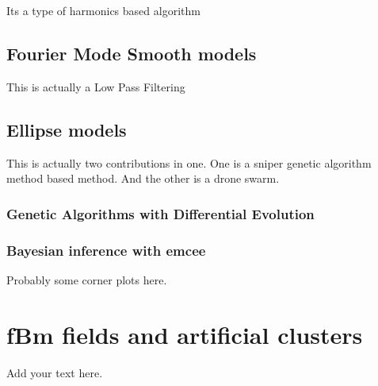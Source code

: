 Its a type of harmonics based algorithm

\subsection{Fourier Mode Smooth models}\label{Chap:interrogationsFourierFiltering}

This is actually a Low Pass Filtering

\subsection{Ellipse models}\label{Chap:interrogationsEllipse}

This is actually two contributions in one. One is a sniper genetic algorithm method based method. And the other is a drone swarm.

\subsubsection{Genetic Algorithms with Differential Evolution}\label{Chap:interrogationsEllipseDE}

\subsubsection{Bayesian inference with emcee}\label{Chap:interrogationsEllipseEmcee}

Probably some corner plots here.

\section{fBm fields and artificial clusters}\label{Chap:assumptionsInterrogationsMethodBody}	%

Add your text here. 


